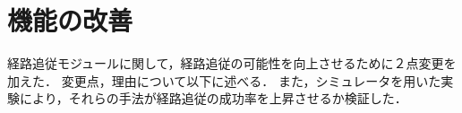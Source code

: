 \chapter{機能の改善}
\label{chap:method}
経路追従モジュールに関して，経路追従の可能性を向上させるために２点変更を加えた．
変更点，理由について以下に述べる．
また，シミュレータを用いた実験により，それらの手法が経路追従の成功率を上昇させるか検証した．




